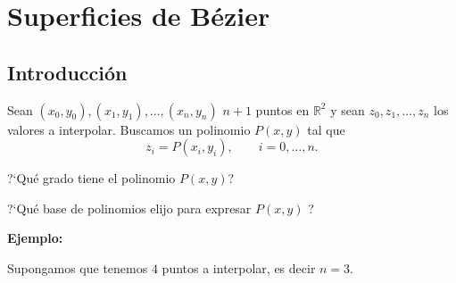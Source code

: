 \documentclass[twoside]{report}
\newcommand{\colocapdf}[2]{\quad\pdfimage width #2 {pdfs/#1.pdf}}
\begin{document}
%
%
%
%
%
%
%
%
%

\section{Superficies de Bézier}

\subsection{Introducción}

Sean $(x_0,y_0),(x_1,y_1), \ldots,(x_n,y_n)$  \quad $n+1$ puntos en $\mathbb{R}^2$ y sean $z_0,z_1,\ldots,z_n$ los valores a interpolar. Buscamos un polinomio $P(x,y)$ tal que
$$z_i=P(x_i,y_i), \quad \quad i=0,\ldots,n.$$

?`Qué grado tiene el polinomio $P(x,y)$?

?`Qué base de polinomios elijo para expresar $P(x,y)$ ?

{\bf Ejemplo:}

Supongamos que tenemos $4$ puntos a interpolar, es decir $n=3$.
\end{document}
